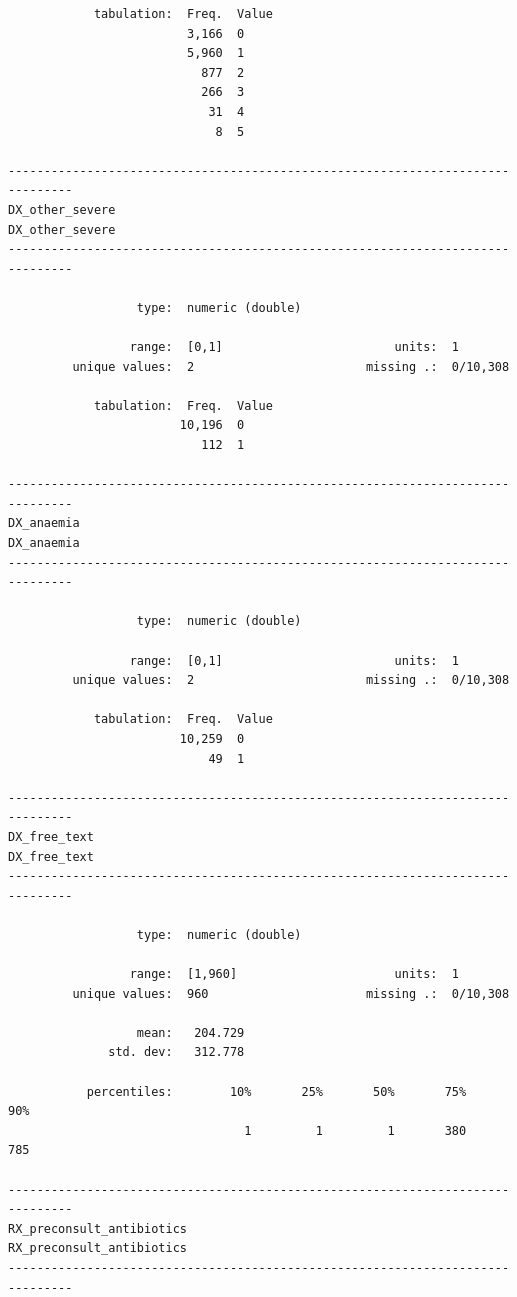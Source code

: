 \documentclass[
  letterpaper,
  DIV=11,
  numbers=noendperiod]{scrreprt}
\begin{document}
\begin{verbatim}
            tabulation:  Freq.  Value
                         3,166  0
                         5,960  1
                           877  2
                           266  3
                            31  4
                             8  5

-------------------------------------------------------------------------------
DX_other_severe                                                 DX_other_severe
-------------------------------------------------------------------------------

                  type:  numeric (double)

                 range:  [0,1]                        units:  1
         unique values:  2                        missing .:  0/10,308

            tabulation:  Freq.  Value
                        10,196  0
                           112  1

-------------------------------------------------------------------------------
DX_anaemia                                                           DX_anaemia
-------------------------------------------------------------------------------

                  type:  numeric (double)

                 range:  [0,1]                        units:  1
         unique values:  2                        missing .:  0/10,308

            tabulation:  Freq.  Value
                        10,259  0
                            49  1

-------------------------------------------------------------------------------
DX_free_text                                                       DX_free_text
-------------------------------------------------------------------------------

                  type:  numeric (double)

                 range:  [1,960]                      units:  1
         unique values:  960                      missing .:  0/10,308

                  mean:   204.729
              std. dev:   312.778

           percentiles:        10%       25%       50%       75%       90%
                                 1         1         1       380       785

-------------------------------------------------------------------------------
RX_preconsult_antibiotics                             RX_preconsult_antibiotics
-------------------------------------------------------------------------------


\end{verbatim}
\end{document}
